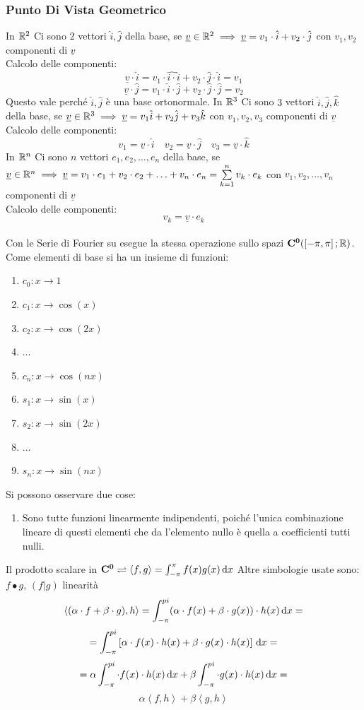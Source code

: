 \subsubsection{Punto Di Vista Geometrico}
In $\mathbb{R}^2$ Ci sono $2$ vettori $\hat{i},\hat{j}$ della base, se $\underline{v}\in \mathbb{R}^2 \implies \underline{v}=v_1\cdot \hat{i}+v_2\cdot \hat{j}$ con $v_1,v_2$ componenti di $\underline{v}$\\
Calcolo delle componenti:
\[\underline{v}\cdot \hat{i} = v_1\cdot \hat{i\cdot }\hat{i}+v_2\cdot \hat{j}\cdot \hat{i}=v_1\]
\[\underline{v}\cdot \hat{j} = v_1\cdot \hat{i}\cdot \hat{j}+v_2\cdot \hat{j}\cdot \hat{j}=v_2\]
Questo vale perché $\hat{i},\hat{j}$ è una base ortonormale.
In $\mathbb{R}^3$ Ci sono $3$ vettori $\hat{i},\hat{j},\hat{k}$ della base, se $\underline{v}\in \mathbb{R}^3 \implies \underline{v}=v_1\hat{i}+v_2\hat{j}+v_3\hat{k}$ con $v_1,v_2,v_3$ componenti di $\underline{v}$\\
Calcolo delle componenti:
\[ v_1=\underline{v}\cdot \hat{i}\quad v_2=\underline{v}\cdot \hat{j}\quad v_3=\underline{v}\cdot \hat{k}  \]
In $\mathbb{R}^n$ Ci sono $n$ vettori $e_1,e_2,\dotsc,e_n$ della base, se $\underline{v}\in \mathbb{R}^n \implies \underline{v}=v_1\cdot e_1+v_2\cdot e_2+\ldots+v_n\cdot e_n=\sum\limits_{k=1}^{n}v_k\cdot e_k$ con $v_1,v_2,\dotsc,v_n$ componenti di $\underline{v}$\\
Calcolo delle componenti:
\[v_k=\underline{v}\cdot e_k\]
\\
Con le Serie di Fourier su esegue la stessa operazione sullo spazi $\mathbf{C^{0}}(\left[-\pi,\pi\right]; \mathbb{R})$. Come elementi di base si ha un insieme di funzioni:
\begin{enumerate}
	\item $c_0:x\to 1$
	\item $c_1:x\to \cos(x)$
	\item $c_2:x\to \cos(2x)$
	\item $\ldots$
	\item $c_n:x\to \cos(nx)$
	\item $s_1:x\to \sin(x)$
	\item $s_2:x\to \sin(2x)$
	\item $\ldots$
	\item $s_n:x\to \sin(nx)$
\end{enumerate}
Si possono osservare due cose:
\begin{enumerate}
	\item Sono tutte funzioni linearmente indipendenti, poiché l'unica combinazione lineare di questi elementi che da l'elemento nullo è quella a coefficienti tutti nulli.
\end{enumerate}
Il prodotto scalare in $\mathbf{C^{0}} \rightleftharpoons \left<f,g\right>=\int_{-\pi}^{\pi}f(x)g(x)\,\mathrm{d}{x}$
Altre simbologie usate sono: $ f\bullet g $, $(f|g)$
\observation linearità
\[\left<(\alpha\cdot f+\beta\cdot g), h \right>= \int_{-\pi}^{pi} (\alpha\cdot f(x)+\beta\cdot g(x))\cdot h(x) \,\mathrm{d}{x}=\]
\[=\int_{-\pi}^{pi} \left[\alpha\cdot f(x)\cdot h(x)+\beta\cdot g(x)\cdot h(x) \right]\,\mathrm{d}{x}= \]
\[=\alpha\int_{-\pi}^{pi} \cdot f(x)\cdot h(x) \,\mathrm{d}{x}+\beta\int_{-\pi}^{pi} \cdot g(x)\cdot h(x) \,\mathrm{d}{x} =\]
\[\alpha\left<f,h\right>+\beta\left<g,h\right>\]

